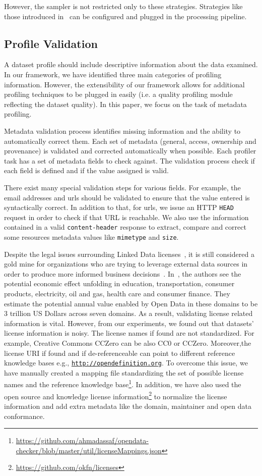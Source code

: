 \documentclass[runningheads,a4paper]{../../Util/LaTEX/llncs}
\begin{document}
However, the sampler is not restricted only to these strategies. Strategies like those introduced in~\cite{Leskovec:KDD:06} can be configured and plugged in the processing pipeline.

\subsection{Profile Validation}
A dataset profile should include descriptive information about the data examined. In our framework, we have identified three main categories of profiling information. However, the extensibility of our framework allows for additional profiling techniques to be plugged in easily (i.e. a quality profiling module reflecting the dataset quality). In this paper, we focus on the task of metadata profiling.

Metadata validation process identifies missing information and the ability to automatically correct them. Each set of metadata (general, access, ownership and provenance) is validated and corrected automatically when possible. Each profiler task has a set of metadata fields to check against. The validation process check if each field is defined and if the value assigned is valid.

There exist many special validation steps for various fields. For example, the email addresses and urls should be validated to ensure that the value entered is syntactically correct. In addition to that, for urls, we issue an HTTP \texttt{HEAD} request in order to check if that URL is reachable. We also use the information contained in a valid \texttt{content-header} response to extract, compare and correct some resources metadata values like \texttt{mimetype} and \texttt{size}.

Despite the legal issues surrounding Linked Data licenses~\cite{Prateek:Misc:13}, it is still considered a gold mine for organizations who are trying to leverage external data sources in order to produce more informed business decisions~\cite{Boyd:Article:11}. In~\cite{Manyika:Report:13}, the authors see the potential economic effect unfolding in education, transportation, consumer products, electricity, oil and gas, health care and consumer finance. They estimate the potential annual value enabled by Open Data in these domains to be 3 trillion US Dollars across seven domains. As a result, validating license related information is vital. However, from our experiments, we found out that datasets' license information is noisy. The license names if found are not standardized. For example, Creative Commons CCZero can be also CC0 or CCZero. Moreover,the license URI if found and if de-referenceable can point to different reference knowledge bases e.g., \texttt{\url{http://opendefinition.org}}. To overcome this issue, we have manually created a mapping file standardizing the set of possible license names and the reference knowledge base\footnote{\url{https://github.com/ahmadassaf/opendata-checker/blob/master/util/licenseMappings.json}}. In addition, we have also used the open source and knowledge license information\footnote{\url{https://github.com/okfn/licenses}} to normalize the license information and add extra metadata like the domain, maintainer and open data conformance.
\end{document}

